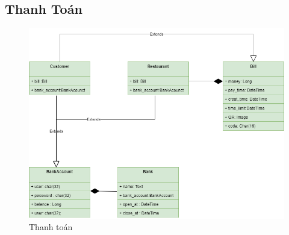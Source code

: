 \newpage
\subsection{Thanh Toán}

\begin{figure}[!h]
    \begin{center}
        \includegraphics[scale=0.5]{Images/ClassDiagram/payment_class.png}
    \end{center}
    \hspace{0.3cm}
    \caption{Thanh toán}
\end{figure}
